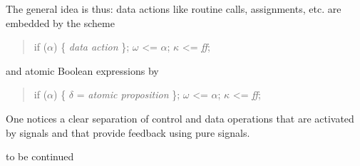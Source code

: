The general idea is thus: data actions like routine calls, assignments, etc. 
are embedded by the scheme
\begin{quote}
\BEP
    if ($\alpha$) \{ \emph{data action} \};
    $\omega$ <= $\alpha$;
    $\kappa$ <= \emph{ff};
\EEP
\end{quote}
and atomic Boolean expressions by
\begin{quote}
\BEP
    if ($\alpha$) \{ $\delta$ = \emph{atomic proposition} \};
    $\omega$ <= $\alpha$;
    $\kappa$ <= \emph{ff};
\EEP
\end{quote}
One notices a clear separation of control and data operations that are activated by signals and that provide feedback using pure signals.

to be continued


%





% 
% 
% 

